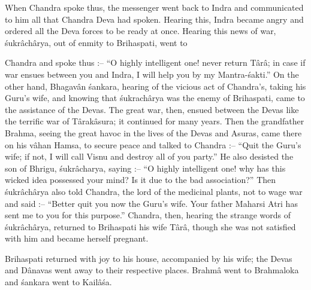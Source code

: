 When Chandra spoke thus, the messenger went back to Indra and communicated to him all that Chandra Deva had spoken. Hearing this, Indra became angry and ordered all the Deva forces to be ready at once. Hearing this news of war, \'sukr\^ach\^arya, out of enmity to Brihaspati, went to

Chandra and spoke thus :-- ``O highly intelligent one! never return T\^ar\^a; in case if war ensues between you and Indra, I will help you by my Mantra-\'sakti.'' On the other hand, Bhagav\^an \'sankara, hearing of the vicious act of Chandra's, taking his Guru's wife, and knowing that \'sukrach\^arya was the enemy of Brihaspati, came to the assistance of the Devas. The great war, then, ensued between the Devas like the terrific war of T\^arak\^asura; it continued for many years. Then the grandfather Brahma, seeing the great havoc in the lives of the Devas and Asuras, came there on his v\^ahan Hamsa, to secure peace and talked to Chandra :-- ``Quit the Guru's wife; if not, I will call Visnu and destroy all of you party.'' He also desisted the son of Bhrigu, \'sukr\^acharya,  saying :-- ``O highly intelligent one! why has this wicked idea possessed your mind? Is it due to the bad association?'' Then \'sukr\^ach\^arya also told Chandra, the lord of the medicinal plants, not to wage war and said :-- ``Better quit you now the Guru's wife. Your father Maharsi Atri has sent me to you for this purpose.'' Chandra, then, hearing the strange words of \'sukr\^ach\^arya, returned to Brihaspati his wife T\^ar\^a, though she was not satisfied with him and became herself pregnant.

Brihaspati returned with joy to his house, accompanied by his wife; the Devas and D\^anavas went away to their respective places. Brahm\^a went to Brahmaloka and \'sankara went to Kail\^a\'sa.

